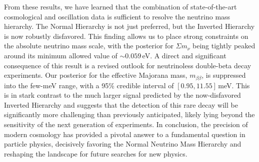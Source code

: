 \documentclass[]{article}
\begin{document}
From these results, we have learned that the combination of state-of-the-art cosmological and oscillation data is sufficient to resolve the neutrino mass hierarchy. The Normal Hierarchy is not just preferred, but the Inverted Hierarchy is now robustly disfavored. This finding allows us to place strong constraints on the absolute neutrino mass scale, with the posterior for $\Sigma m_\nu$ being tightly peaked around its minimum allowed value of $\sim 0.059$\,eV. A direct and significant consequence of this result is a revised outlook for neutrinoless double-beta decay experiments. Our posterior for the effective Majorana mass, $m_{\beta\beta}$, is suppressed into the few-meV range, with a 95\% credible interval of $[0.95, 11.55]$\,meV. This is in stark contrast to the much larger signal predicted by the now-disfavored Inverted Hierarchy and suggests that the detection of this rare decay will be significantly more challenging than previously anticipated, likely lying beyond the sensitivity of the next generation of experiments. In conclusion, the precision of modern cosmology has provided a pivotal answer to a fundamental question in particle physics, decisively favoring the Normal Neutrino Mass Hierarchy and reshaping the landscape for future searches for new physics.


{}

\end{document}
